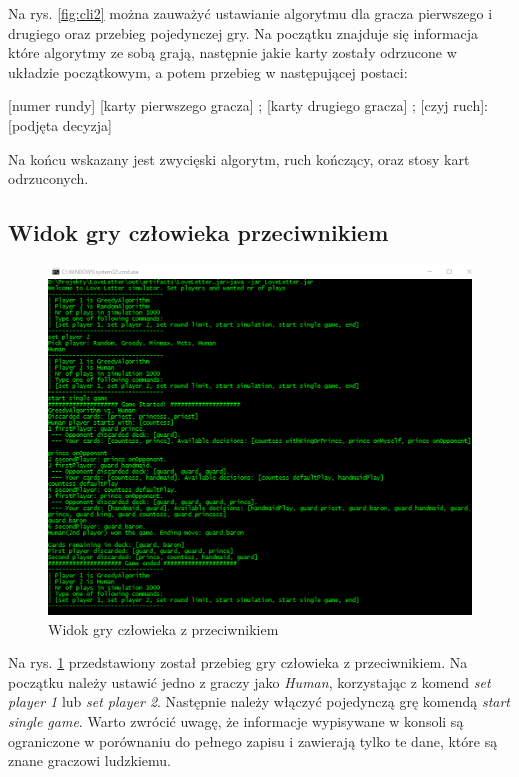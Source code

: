 Na rys. \ref{fig:cli2} można zauważyć ustawianie algorytmu dla gracza pierwszego i drugiego oraz przebieg pojedynczej gry. Na początku znajduje się informacja które algorytmy ze sobą grają, następnie jakie karty zostały odrzucone w układzie początkowym, a potem przebieg w następującej postaci:
\begin{center}
	[numer rundy] [karty pierwszego gracza] ; [karty drugiego gracza] ; [czyj ruch]: [podjęta decyzja]
\end{center}
Na końcu wskazany jest zwycięski algorytm, ruch kończący, oraz stosy kart odrzuconych.


\subsection*{Widok gry człowieka przeciwnikiem}
\begin{figure}[H]
	\centering
	\includegraphics[width=\textwidth]{Resources/cli3.png}
	\caption{Widok gry człowieka z przeciwnikiem} 
	\label{fig:cli3}
\end{figure}

Na rys. \ref{fig:cli3} przedstawiony został przebieg gry człowieka z przeciwnikiem. Na początku należy ustawić jedno z graczy jako \textit{Human}, korzystając z komend \textit{set player 1} lub \textit{set player 2}. Następnie należy włączyć pojedynczą grę komendą \textit{start single game}. Warto zwrócić uwagę, że informacje wypisywane w konsoli są ograniczone w porównaniu do pełnego zapisu i zawierają tylko te dane, które są znane graczowi ludzkiemu.


